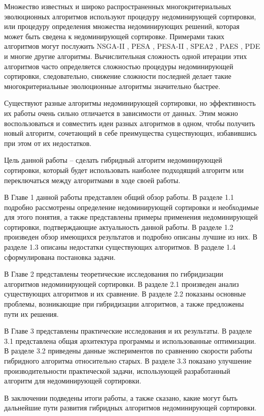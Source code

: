 \startprefacepage

Множество известных и широко распространенных многокритериальных эволюционных алгоритмов используют процедуру
недоминирующей сортировки, или процедуру определения множества недоминирующих решений, которая может быть сведена
к недоминирующей сортировке. Примерами таких алгоритмов могут послужить NSGA-II \cite{NSGA-II}, PESA \cite{PESA},
PESA-II \cite{PESA-II}, SPEA2 \cite{SPEA2}, PAES \cite{PAES}, PDE \cite{PDE} и многие другие алгоритмы.
Вычислительная сложность одной итерации этих алгоритмов часто определяется сложностью процедуры недоминирующей
сортировки, следовательно, снижение сложности последней делает такие многокритериальные эволюционные алгоритмы
значительно быстрее.

Существуют разные алгоритмы недоминирующей сортировки, но эффективность их работы очень сильно отличается в зависимости
от данных. Этим можно воспользоваться и совместить идеи разных алгоритмов в одном, чтобы получить новый алгоритм,
сочетающий в себе преимущества существующих, избавившись при этом от их недостатков.

Цель данной работы -- сделать гибридный алгоритм недоминирующей сортировки, который будет использовать наиболее
подходящий алгоритм или переключаться между алгоритмами в ходе своей работы.

В Главе 1 данной работы представлен общий обзор работы.
В разделе 1.1 подробно рассмотрены определение недоминирующей сортировки и необходимые для этого понятия, а также
представлены примеры применения недоминирующей сортировки, подтверждающие актуальность данной работы.
В разделе 1.2 произведен обзор имеющихся результатов и подробно описаны лучшие из них.
В разделе 1.3 описаны недостатки существующих алгоритмов.
В разделе 1.4 сформулирована постановка задачи.

В Главе 2 представлены теоретические исследования по гибридизации алгоритмов недоминирующей сортировки.
В разделе 2.1 произведен анализ существующих алгоритмов и их сравнение.
В разделе 2.2 показаны основные проблемы, возникающие при гибридизации алгоритмов, а также предложены пути их решения.

В Главе 3 представлены практические исследования и их результаты.
В разделе 3.1 представлена общая архитектура программы и использованные оптимизации.
В разделе 3.2 приведены данные экспериментов по сравнению скорости работы гибридного алгоритма относительно старых.
В разделе 3.3 показано улучшение производительности практической задачи, использующей разработанный алгоритм для
недоминирующей сортировки.

В заключении подведены итоги работы, а также сказано, какие могут быть дальнейшие пути развития гибридных алгоритмов
недоминирующей сортировки.
